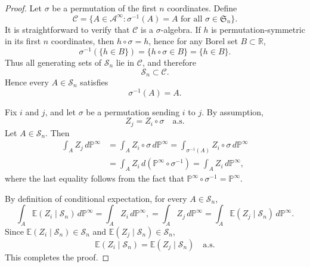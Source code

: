 \documentclass[12pt]{article}
\renewcommand{\(}{\left(}%
\renewcommand{\)}{\right)}%
\renewcommand{\[}{\left[}%
\renewcommand{\]}{\right]}%
\newcommand{\p}{\mathbb{P}}
\newtheorem{proof}{Proof.}}
\begin{document}
\begin{proof}

Let $\sigma$ be a permutation of the first $n$ coordinates.  
Define
\begin{equation*}
\mathcal C
=
\{A \in \mathcal A^\infty : \sigma^{-1}(A) = A \text{ for all } \sigma \in \mathfrak S_n \}.
\end{equation*}
It is straightforward to verify that $\mathcal C$ is a $\sigma$-algebra. If $h$ is permutation-symmetric in its first $n$ coordinates, then $h \circ \sigma = h$, hence for any Borel set $B \subset \mathbb R$,
\begin{equation*}
\sigma^{-1}(\{h \in B\})
=
\{h \circ \sigma \in B\}
=
\{h \in B\}.
\end{equation*}
Thus all generating sets of $\mathscr S_n$ lie in $\mathcal C$, and therefore
\begin{equation*}
\mathscr S_n \subset \mathcal C.
\end{equation*}
Hence every $A \in \mathscr S_n$ satisfies
\begin{equation*}
\sigma^{-1}(A) = A.
\end{equation*}

Fix $i$ and $j$, and let $\sigma$ be a permutation sending $i$ to $j$.  
By assumption,
\begin{equation*}
Z_j = Z_i \circ \sigma \quad \text{a.s.}
\end{equation*}
Let $A \in \mathscr S_n$. Then
\begin{equation*}
\begin{split}
    \int_A Z_j \, d\p^\infty
&=
\int_A Z_i \circ \sigma \, d\p^\infty=\int_{\sigma^{-1}( A)} Z_i \circ \sigma \, d\p^\infty\\
&=\int_{A} Z_i \, d(\p^\infty\circ \sigma^{-1}) =\int_{A} Z_i \, d\p^\infty,
\end{split}
\end{equation*} 
where the last equality follows from the fact that $\p^\infty\circ \sigma^{-1}=\p^\infty$.

By definition of conditional expectation, for every $A \in \mathscr S_n$,
\begin{equation*}
\int_A \mathbb{E}(Z_i \mid \mathscr S_n) \, d\p^\infty
=
\int_A Z_i \, d\p^\infty,
=\int_A Z_j \, d\p^\infty=
\int_A \mathbb{E}(Z_j \mid \mathscr S_n) \, d\p^\infty.
\end{equation*}
Since $\mathbb{E}(Z_i \mid \mathscr S_n)\in\mathscr{S}_n$ and $\mathbb{E}(Z_j \mid \mathscr S_n)\in\mathscr{S}_n$,
\begin{equation*}
\mathbb{E}(Z_i \mid \mathscr S_n)
=
\mathbb{E}(Z_j \mid \mathscr S_n)
\quad \text{a.s.}
\end{equation*}
This completes the proof.
\end{proof}
\end{document}
